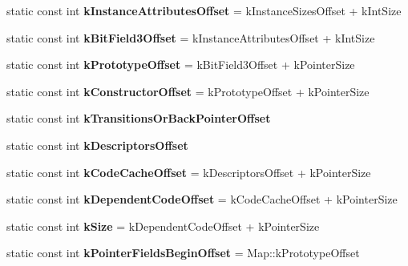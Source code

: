 \begin{DoxyCompactItemize}
\item 
\hypertarget{classv8_1_1internal_1_1_map_a30dbbec5152d64e484d586a918b5be0a}{}static const int {\bfseries k\+Instance\+Attributes\+Offset} = k\+Instance\+Sizes\+Offset + k\+Int\+Size\label{classv8_1_1internal_1_1_map_a30dbbec5152d64e484d586a918b5be0a}

\item 
\hypertarget{classv8_1_1internal_1_1_map_a58d829391df48dd6ed224f188b3420de}{}static const int {\bfseries k\+Bit\+Field3\+Offset} = k\+Instance\+Attributes\+Offset + k\+Int\+Size\label{classv8_1_1internal_1_1_map_a58d829391df48dd6ed224f188b3420de}

\item 
\hypertarget{classv8_1_1internal_1_1_map_ae771e9e987681d98dd684c85b18c9a61}{}static const int {\bfseries k\+Prototype\+Offset} = k\+Bit\+Field3\+Offset + k\+Pointer\+Size\label{classv8_1_1internal_1_1_map_ae771e9e987681d98dd684c85b18c9a61}

\item 
\hypertarget{classv8_1_1internal_1_1_map_ad032da2473a08f6de04105708c6bdd6a}{}static const int {\bfseries k\+Constructor\+Offset} = k\+Prototype\+Offset + k\+Pointer\+Size\label{classv8_1_1internal_1_1_map_ad032da2473a08f6de04105708c6bdd6a}

\item 
static const int {\bfseries k\+Transitions\+Or\+Back\+Pointer\+Offset}
\item 
static const int {\bfseries k\+Descriptors\+Offset}
\item 
\hypertarget{classv8_1_1internal_1_1_map_ac3ced53934ca552850c1ac86de495eb6}{}static const int {\bfseries k\+Code\+Cache\+Offset} = k\+Descriptors\+Offset + k\+Pointer\+Size\label{classv8_1_1internal_1_1_map_ac3ced53934ca552850c1ac86de495eb6}

\item 
\hypertarget{classv8_1_1internal_1_1_map_a958ba93be0a3eb39e2465320493b2180}{}static const int {\bfseries k\+Dependent\+Code\+Offset} = k\+Code\+Cache\+Offset + k\+Pointer\+Size\label{classv8_1_1internal_1_1_map_a958ba93be0a3eb39e2465320493b2180}

\item 
\hypertarget{classv8_1_1internal_1_1_map_aa4e29ae9c6ce51359888cf4a769a1585}{}static const int {\bfseries k\+Size} = k\+Dependent\+Code\+Offset + k\+Pointer\+Size\label{classv8_1_1internal_1_1_map_aa4e29ae9c6ce51359888cf4a769a1585}

\item 
\hypertarget{classv8_1_1internal_1_1_map_a31a62da6ae3835ea76e1f48a735f5e18}{}static const int {\bfseries k\+Pointer\+Fields\+Begin\+Offset} = Map\+::k\+Prototype\+Offset\label{classv8_1_1internal_1_1_map_a31a62da6ae3835ea76e1f48a735f5e18}


\end{DoxyCompactItemize}

